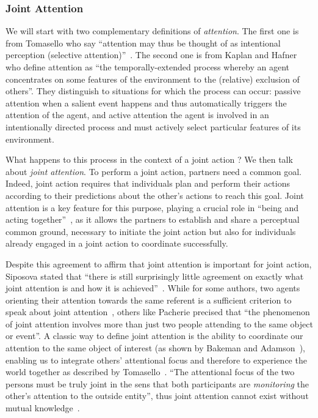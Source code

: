 \documentclass[a4paper,11pt,twoside]{StyleThese}
\begin{document}
\subsubsection{Joint Attention}\label{chap1:subsubsec:joint_att}
We will start with two complementary definitions of \textit{attention}. The first one is from Tomasello \etal{} who say ``attention may thus be thought of as intentional perception (selective attention)''~\cite{tomasello_2005_understanding}. The second one is from Kaplan and Hafner~\cite{kaplan_2006_challenges} who define attention as ``the temporally-extended process whereby an agent concentrates on some features of the environment to the (relative) exclusion of others''. They distinguish to situations for which the process can occur: passive attention when a salient event happens and thus automatically triggers the attention of the agent, and active attention the agent is involved in an
intentionally directed process and must actively select particular features of its environment. 

What happens to this process in the context of a joint action ? We then talk about \textit{joint attention}. To perform a joint action, partners need a common goal. Indeed, joint action requires that individuals plan and perform their actions according to their predictions about the other’s actions to reach this goal. Joint attention is a key feature for this purpose, playing a crucial role in ``being and acting together''~\cite{tomasello_2009_cultural}, as it allows the partners to establish and share a perceptual common ground, necessary to initiate the joint action but also for individuals already engaged in a joint action to coordinate successfully. 

Despite this agreement to affirm that joint attention is important for joint action, Siposova stated that ``there is still surprisingly little agreement on exactly what joint attention is and how it is achieved''~\cite{siposova_2019_new}. While for some authors, two agents orienting their attention towards the same referent is a sufficient criterion to speak about joint attention~\cite{butterworth_1991_minds}, others like Pacherie precised that ``the phenomenon of joint attention involves more than just two people attending to the same object or event''. A classic way to define joint attention is the ability to coordinate our attention to the same object of interest (\eg as shown by Bakeman and Adamson~\cite{bakeman_1984_coordinating}), enabling us to integrate others’ attentional focus and therefore to experience the world together as described by Tomasello~\cite{tomasello_2009_cultural}.  ``The attentional focus of the two persons must be truly joint in the sens that both participants are \textit{monitoring} the other's attention to the outside entity'', thus joint attention cannot exist without mutual knowledge~\cite[p.~106]{tomasello_1995_joint}.
\end{document}
